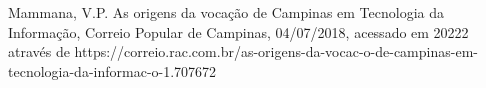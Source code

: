 \documentclass[
12pt,		%
openright,	%
twoside,  %
a4paper,			%
chapter=TITLE,		%
english,			%
french,				%
spanish,			%
brazil				%
]{USPSC-classe/USPSC}
\begin{document}
\begin{flushleft}
\begin{flushleft}
\begin{flushleft}
\begin{flushleft}
\begin{flushleft}
\begin{flushleft}
\begin{flushleft}
\begin{flushleft}
\begin{flushleft}
\begin{flushleft}
[MAMMANA, 2018] Mammana, V.P. As origens da voca\c{c}\~ao de Campinas em Tecnologia da Informa\c{c}\~ao, Correio Popular de Campinas, 04/07/2018, acessado em 20222 atrav\'es de https://correio.rac.com.br/as-origens-da-vocac-o-de-campinas-em-tecnologia-da-informac-o-1.707672
\end{flushleft}


\end{flushleft}


\end{flushleft}


\end{flushleft}


\end{flushleft}


\end{flushleft}


\end{flushleft}


\end{flushleft}


\end{flushleft}


\end{flushleft}
\end{document}
